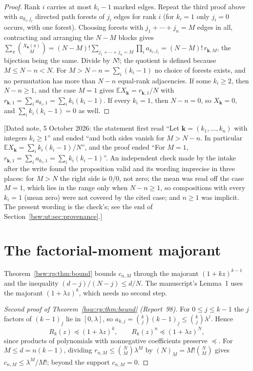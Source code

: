 \documentclass[11pt,letterpaper]{article}
\theoremstyle{definition}
\theoremstyle{remark}
\newcommand{\EE}{\mathbb E}
\newcommand{\fall}[2]{(#1)_{\underline{#2}}}
\begin{document}
\begin{proof}
Rank $i$ carries at most $k_i-1$ marked edges.  Repeat the third proof
above with $a_{k_i,j_i}$ directed path forests of $j_i$ edges for rank $i$
(for $k_i=1$ only $j_i=0$ occurs, with one forest).  Choosing forests with
$j_1+\cdots+j_n=M$ edges in all, contracting and arranging the $N-M$
blocks gives $\sum_\pi\binom{X_{\mathbf k}(\pi)}M
=(N-M)!\sum_{j_1+\cdots+j_n=M}\prod_ia_{k_i,j_i}
=(N-M)!\,r_{\mathbf k,M}$, the bijection being the same.  Divide by $N!$;
the quotient is defined because $M\le N-n<N$.  For $M>N-n=\sum_i(k_i-1)$
no choice of forests exists, and no permutation has more than $N-n$
equal-rank adjacencies.  If some $k_i\ge2$, then $N-n\ge1$, and the case
$M=1$ gives $\EE X_{\mathbf k}=r_{\mathbf k,1}/N$ with
$r_{\mathbf k,1}=\sum_ia_{k_i,1}=\sum_ik_i(k_i-1)$.  If every $k_i=1$, then
$N-n=0$, so $X_{\mathbf k}=0$, and $\sum_ik_i(k_i-1)=0$ as well.
\end{proof}

[Dated note, 5 October 2026: the statement first read ``Let
$\mathbf k=(k_1,\ldots,k_n)$ with integers $k_i\ge1$'' and ended ``and both
sides vanish for $M>N-n$.  In particular
$\EE X_{\mathbf k}=\sum_ik_i(k_i-1)/N$'', and the proof ended ``For $M=1$,
$r_{\mathbf k,1}=\sum_ia_{k_i,1}=\sum_ik_i(k_i-1)$''.  An independent check
made by the intake after the write found the proposition valid and its
wording imprecise in three places: for $M>N$ the right side is $0/0$, not
zero; the mean was read off the case $M=1$, which lies in the range only
when $N-n\ge1$, so compositions with every $k_i=1$ (mean zero) were not
covered by the cited case; and $n\ge1$ was implicit.  The present wording
is the check's; see the end of Section~\ref{bsw:ut:sec:provenance}.]

\section{The factorial-moment majorant}\label{bsw:ut:sec:majorant}

Theorem~\ref{bsw:rp:thm:bound} bounds $c_{n,M}$ through the majorant
$(1+kz)^{k-1}$ and the inequality $(d-j)/(N-j)\le d/N$.  The manuscript's
Lemma~1 uses the majorant $(1+\lambda z)^k$, which needs no second step.

\begin{proof}[Second proof of Theorem~\ref{bsw:rp:thm:bound} (Report~98)]
For $0\le j\le k-1$ the $j$ factors of $\fall{k-1}j$ lie in $[0,\lambda]$,
so $a_{k,j}=\binom kj\fall{k-1}j\le\binom kj\lambda^j$.  Hence
\[
 R_k(z)\preceq(1+\lambda z)^k,\qquad R_k(z)^n\preceq(1+\lambda z)^N,
\]
since products of polynomials with nonnegative coefficients preserve
$\preceq$.  For $M\le d=n(k-1)$, dividing $r_{n,M}\le\binom NM\lambda^M$
by $\fall NM=M!\binom NM$ gives $c_{n,M}\le\lambda^M/M!$; beyond the
support $c_{n,M}=0$.
\end{proof}
\end{document}
